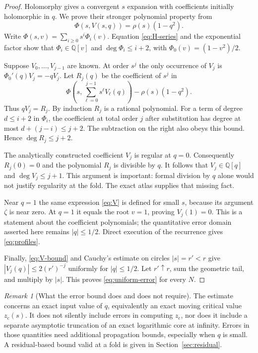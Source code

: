 \documentclass[11pt,a4paper]{article}
\theoremstyle{definition}
\theoremstyle{remark}
\newtheorem{remark}[theorem]{Remark}
\newcommand{\Q}{\mathbb Q}
\newcommand{\zc}{z_{\mathrm c}}
\begin{document}
\begin{proof}
Holomorphy gives a convergent $s$ expansion with coefficients initially
holomorphic in $q$. We prove their stronger polynomial property from
\[
 \Phi(s,V(s,q))=\rho(s)(1-q^2).
\]
Write $\Phi(s,v)=\sum_{i\ge0}s^i\Phi_i(v)$. Equation
\eqref{eq:H-series} and the exponential factor show that
$\Phi_i\in\Q[v]$ and $\deg\Phi_i\le i+2$, with
$\Phi_0(v)=(1-v^2)/2$.

Suppose $V_0,\ldots,V_{j-1}$ are known. At order $s^j$ the only occurrence
of $V_j$ is $\Phi_0'(q)V_j=-qV_j$. Let $R_j(q)$ be the coefficient of
$s^j$ in
\begin{equation}\label{eq:profile-recursion}
 \Phi\left(s,\sum_{\ell=0}^{j-1}s^\ell V_\ell(q)\right)
                     -\rho(s)(1-q^2).
\end{equation}
Thus $qV_j=R_j$. By induction $R_j$ is a rational polynomial. For a term
of degree $d\le i+2$ in $\Phi_i$, the coefficient at total order $j$
after substitution has degree at most $d+(j-i)\le j+2$. The subtraction
on the right also obeys this bound. Hence $\deg R_j\le j+2$.

The analytically constructed coefficient $V_j$ is regular at $q=0$.
Consequently $R_j(0)=0$ and the polynomial $R_j$ is divisible by $q$.
It follows that $V_j\in\Q[q]$ and $\deg V_j\le j+1$. This argument is
important: formal division by $q$ alone would not justify regularity at
the fold. The exact atlas supplies that missing fact.

Near $q=1$ the same expression \eqref{eq:V} is defined for small $s$,
because its argument $\zeta$ is near zero. At $q=1$ it equals the root
$v=1$, proving $V_j(1)=0$. This is a statement about the coefficient
polynomials; the quantitative error domain asserted here remains
$|q|\le1/2$. Direct execution of the recurrence gives
\eqref{eq:profiles}.

Finally, \eqref{eq:V-bound} and Cauchy's estimate on circles $|s|=r'<r$
give $|V_j(q)|\le2(r')^{-j}$ uniformly for $|q|\le1/2$. Let $r'\uparrow r$,
sum the geometric tail, and multiply by $|s|$. This proves
\eqref{eq:uniform-error} for every $N$.
\end{proof}

\begin{remark}[What the error bound does and does not require]
The estimate concerns an exact input value of $q$, equivalently an exact
moving critical value $\zc(s)$. It does not silently include errors in
computing $\zc$, nor does it include a separate asymptotic truncation of
an exact logarithmic core at infinity. Errors in those quantities need
additional propagation bounds, especially when $q$ is small. A
residual-based bound valid at a fold is given in Section~\ref{sec:residual}.
\end{remark}
\end{document}
